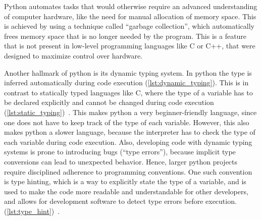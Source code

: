 Python automates tasks that would otherwise require an advanced understanding of
computer hardware, like the need for manual allocation of memory space. This is
achieved by using a technique called ``garbage collection'', which automatically
frees memory space that is no longer needed by the program. This is a feature
that is not present in low-level programming languages like C or C++, that were
designed to maximize control over hardware.

Another hallmark of python is its dynamic typing system. In python the type  is
inferred automatically during code execution (\autoref{lst:dynamic_typing}).
This is in contrast to statically typed languages like C, where the type of a
variable has to be declared explicitly and cannot be changed during code
execution (\autoref{lst:static_typing})~\cite{PythonLanguageReference}. This
makes python a very beginner-friendly language, since one does not have to keep
track of the type of each variable. However, this also makes python a slower
language, because the interpreter has to check the type of each variable during
code execution. Also, developing code with dynamic typing systems is prone to
introducing bugs (``type errors''), because implicit type conversions can lead
to unexpected behavior. Hence, larger python projects require disciplined
adherence to programming conventions. One such convention is type hinting, which
is a way to explicitly state the type of a variable, and is used to make the
code more readable and understandable for other developers, and allows for
development software to detect type errors before execution.
(\autoref{lst:type_hint})~\cite{vanrossumPEP484Type2014}.


